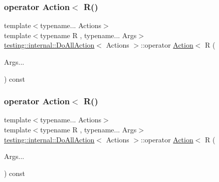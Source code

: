 \mbox{\label{structtesting_1_1internal_1_1_do_all_action_a7328dad6615578e385950249f9259139}} 
\subsubsection{\texorpdfstring{operator Action$<$ R()}{operator Action< R()}\hspace{0.1cm}{\footnotesize\ttfamily [1/2]}}
{\footnotesize\ttfamily template$<$typename... Actions$>$ \\
template$<$typename R , typename... Args$>$ \\
\mbox{\hyperlink{structtesting_1_1internal_1_1_do_all_action}{testing\+::internal\+::\+Do\+All\+Action}}$<$ Actions $>$\+::operator \mbox{\hyperlink{classtesting_1_1_action}{Action}}$<$ R (\begin{DoxyParamCaption}\item[{Args...}]{ }\end{DoxyParamCaption}) const\hspace{0.3cm}{\ttfamily [inline]}}

\mbox{\label{structtesting_1_1internal_1_1_do_all_action_a7328dad6615578e385950249f9259139}} 
\subsubsection{\texorpdfstring{operator Action$<$ R()}{operator Action< R()}\hspace{0.1cm}{\footnotesize\ttfamily [2/2]}}
{\footnotesize\ttfamily template$<$typename... Actions$>$ \\
template$<$typename R , typename... Args$>$ \\
\mbox{\hyperlink{structtesting_1_1internal_1_1_do_all_action}{testing\+::internal\+::\+Do\+All\+Action}}$<$ Actions $>$\+::operator \mbox{\hyperlink{classtesting_1_1_action}{Action}}$<$ R (\begin{DoxyParamCaption}\item[{Args...}]{ }\end{DoxyParamCaption}) const\hspace{0.3cm}{\ttfamily [inline]}}




